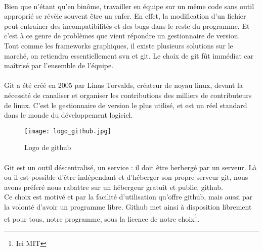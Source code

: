         \paragraph{}
            Bien que n'étant qu'en binôme, travailler en équipe sur un même code sans outil approprié se révèle souvent être un enfer. En effet, la modification d'un fichier peut entrainer des incompatibilités et des bugs dans le reste du programme. Et c'est à ce genre de problèmes que vient répondre un gestionnaire de version.
            \\ Tout comme les frameworks graphiques, il existe plusieurs solutions sur le marché, on retiendra essentiellement svn et git. Le choix de git fût immédiat car maîtrisé par l'ensemble de l'équipe. 

        \paragraph{}
            Git a été créé en 2005 par Linus Torvalds, créateur de noyau linux, devant la nécessité de canaliser et organiser les contributions des milliers de contributeurs de linux. C'est le gestionnaire de version le plus utilisé, et est un réel standard dans le monde du développement logiciel.

        \begin{figure}[h]
            \begin{center}
                \texttt{[image: logo\_github.jpg]}
            \end{center}

            \caption{Logo de github}
            \label{github}
        \end{figure}

        \paragraph{}
            Git est un outil déscentralisé, un service : il doit être herbergé par un serveur. Là ou il est possible d'être indépendant et d'héberger son propre serveur git, nous avons préferé nous rabattre sur un hébergeur gratuit et public, github.
            \\ Ce choix est motivé et par la facilité d'utilisation qu'offre github, mais aussi par la volonté d'avoir un programme libre. Github met ainsi à 
            disposition librement et pour tous, notre programme, sous la licence de notre choix\footnote{Ici MIT}.
            



